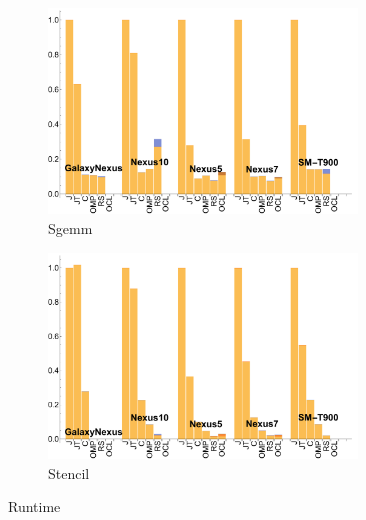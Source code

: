 \begin{figure}[ht]
  \begin{subfigure}[b]{0.5\textwidth}
      \centering
      \includegraphics[width=0.9\textwidth]{data/Sgemm_time.pdf}
      \caption{Sgemm}\label{fig:Sgemm}
  \end{subfigure}
  \begin{subfigure}[b]{0.5\textwidth}
      \centering
      \includegraphics[width=0.9\textwidth]{data/Stencil_time.pdf}
      \caption{Stencil}
      \label{fig:Stencil}
  \end{subfigure}

  \caption{Runtime}
\end{figure}
\FloatBarrier

